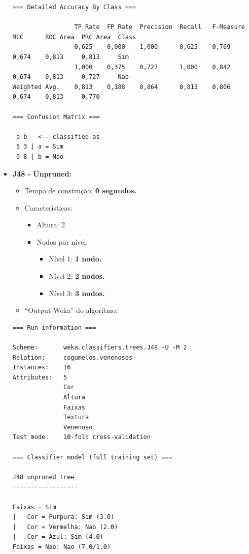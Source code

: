 \documentclass[
    article,            %
    11pt,               %
    oneside,            %
    a4paper,            %
    english,            %
    brazil,             %
    sumario=tradicional,
    ]{abntex2}
\begin{document}
\begin{itemize}
\begin{Verbatim}[frame=single, fontsize=\tiny]
=== Detailed Accuracy By Class ===

                 TP Rate  FP Rate  Precision  Recall   F-Measure  MCC      ROC Area  PRC Area  Class
                 0,625    0,000    1,000      0,625    0,769      0,674    0,813     0,813     Sim
                 1,000    0,375    0,727      1,000    0,842      0,674    0,813     0,727     Nao
Weighted Avg.    0,813    0,188    0,864      0,813    0,806      0,674    0,813     0,770     

=== Confusion Matrix ===

 a b   <-- classified as
 5 3 | a = Sim
 0 8 | b = Nao
\end{Verbatim}


    \item \textbf{J48 - Unpruned:}
    \begin{itemize}
        \item Tempo de construção: \textbf{0 segundos.}
        \item Características:
        \begin{itemize}
            \item Altura: 2
            \item Nodos por nível:
                \begin{itemize}
                    \item Nível 1: \textbf{1 nodo.}
                    \item Nível 2: \textbf{2 nodos.}
                    \item Nível 3: \textbf{3 nodos.}
                \end{itemize}
        \end{itemize}
        \item ``Output Weka'' do algoritmo:
    \end{itemize}   


\begin{Verbatim}[frame=single, fontsize=\tiny]
=== Run information ===

Scheme:       weka.classifiers.trees.J48 -U -M 2
Relation:     cogumelos.venenosos
Instances:    16
Attributes:   5
              Cor
              Altura
              Faixas
              Textura
              Venenoso
Test mode:    10-fold cross-validation

=== Classifier model (full training set) ===

J48 unpruned tree
------------------

Faixas = Sim
|   Cor = Purpura: Sim (3.0)
|   Cor = Vermelha: Nao (2.0)
|   Cor = Azul: Sim (4.0)
Faixas = Nao: Nao (7.0/1.0)


\end{Verbatim}
\end{itemize}
\end{document}
